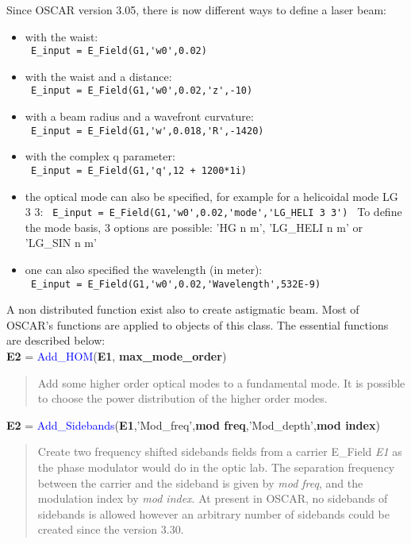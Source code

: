 Since OSCAR version 3.05, there is now different ways to define a laser beam:
\begin{itemize}
  \item with the waist: \\
        \verb? E_input = E_Field(G1,'w0',0.02) ?
  \item with the waist and a distance: \\
        \verb? E_input = E_Field(G1,'w0',0.02,'z',-10) ?
  \item with a beam radius and a wavefront curvature: \\
        \verb? E_input = E_Field(G1,'w',0.018,'R',-1420) ?
  \item with the complex q parameter: \\
        \verb? E_input = E_Field(G1,'q',12 + 1200*1i) ?
  \item the optical mode can also be specified, for example for a helicoidal mode LG 3 3:
        \verb? E_input = E_Field(G1,'w0',0.02,'mode','LG_HELI 3 3') ?
        To define the mode basis, 3 options are possible: 'HG n m', 'LG\_HELI n m' or 'LG\_SIN n m'
  \item one can also specified the wavelength (in meter):\\
        \verb? E_input = E_Field(G1,'w0',0.02,'Wavelength',532E-9) ?
\end{itemize}
A non distributed function exist also to create astigmatic beam. Most of OSCAR's functions are applied to objects of this class. The essential functions are described below:\\

\noindent \textbf{E2} = \textcolor{blue}{Add\_HOM}(\textbf{E1}, \textbf{max\_mode\_order})
\vspace*{-0.2cm}
\begin{quote}
Add some higher order optical modes to a fundamental mode. It is possible to choose the power distribution of the higher order modes.
\end{quote}

\noindent \textbf{E2} = \textcolor{blue}{Add\_Sidebands}(\textbf{E1},'Mod\_freq',\textbf{mod freq},'Mod\_depth',\textbf{mod index})
\vspace*{-0.2cm}
\begin{quote}
Create two frequency shifted sidebands fields from a carrier E\_Field \textsl{E1} as the phase modulator would do in the optic lab. The separation frequency between the carrier and the sideband is given by \textsl{mod freq}, and the modulation index by \textsl{mod index}. At present in OSCAR, no sidebands of sidebands is allowed however an arbitrary number of sidebands could be created since the version 3.30.
\end{quote}

